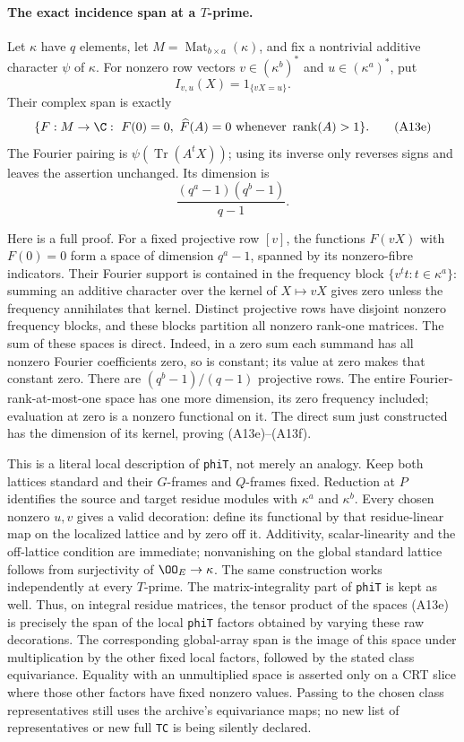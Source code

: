\documentclass[11pt]{article}
\theoremstyle{definition}\newtheorem{definition}[theorem]{Definition}\newtheorem{remark}[theorem]{Remark}
\begin{document}
\paragraph{The exact incidence span at a $T$-prime.}
Let $\kappa$ have $q$ elements, let
$M=\operatorname{Mat}_{b\times a}(\kappa)$, and fix a nontrivial
additive character $\psi$ of $\kappa$.
For nonzero row vectors $v\in(\kappa^b)^*$ and
$u\in(\kappa^a)^*$, put
\[
                    I_{v,u}(X)=1_{\{vX=u\}}.
                    \tag{A13d}
\]
Their complex span is exactly
\[
 \{F:M\to\C:\ F(0)=0,
       \ \widehat F(A)=0\text{ whenever }\operatorname{rank}(A)>1\}.
 \tag{A13e}
\]
The Fourier pairing is $\psi(\operatorname{Tr}(A^tX))$;
using its inverse only reverses signs and leaves the assertion
unchanged.  Its dimension is
\[
                 \frac{(q^a-1)(q^b-1)}{q-1}.
                 \tag{A13f}
\]

Here is a full proof.  For a fixed projective row $[v]$,
the functions $F(vX)$ with $F(0)=0$ form a space of
dimension $q^a-1$, spanned by its nonzero-fibre indicators.
Their Fourier support is contained in the frequency block
$\{v^tt:t\in\kappa^a\}$: summing an additive character over
the kernel of $X\mapsto vX$ gives zero unless the frequency
annihilates that kernel.  Distinct projective rows have disjoint
nonzero frequency blocks, and these blocks partition all
nonzero rank-one matrices.  The sum of these spaces is direct.
Indeed, in a zero sum each summand has all nonzero Fourier
coefficients zero, so is constant; its value at zero makes
that constant zero.  There are $(q^b-1)/(q-1)$ projective
rows.  The entire Fourier-rank-at-most-one space has one more
dimension, its zero frequency included; evaluation at zero
is a nonzero functional on it.  The direct sum just constructed
has the dimension of its kernel, proving (A13e)--(A13f).

This is a literal local description of \texttt{phiT}, not
merely an analogy.  Keep both lattices standard and their
$G$-frames and $Q$-frames fixed.  Reduction at $P$ identifies
the source and target residue modules with $\kappa^a$ and
$\kappa^b$.  Every chosen nonzero $u,v$ gives a valid
decoration: define its functional by that residue-linear
map on the localized lattice and by zero off it.  Additivity,
scalar-linearity and the off-lattice condition are immediate;
nonvanishing on the global standard lattice follows from
surjectivity of $\OO_E\to\kappa$.  The same construction
works independently at every $T$-prime.  The matrix-integrality
part of \texttt{phiT} is kept as well.  Thus, on integral
residue matrices, the tensor product of the spaces (A13e)
is precisely the span of the local \texttt{phiT} factors
obtained by varying these raw decorations.  The corresponding
global-array span is the image of this space under multiplication
by the other fixed local factors, followed by the stated class
equivariance.  Equality with an unmultiplied space is asserted
only on a CRT slice where those other factors have fixed nonzero
values.
Passing to the chosen class representatives still uses the
archive's equivariance maps; no new list of representatives
or new full \texttt{TC} is being silently declared.
\end{document}
